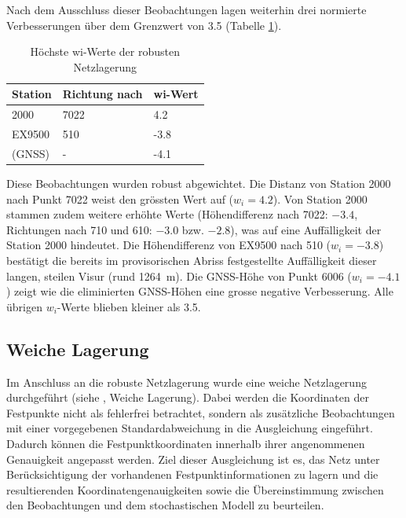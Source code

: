 Nach dem Ausschluss dieser Beobachtungen lagen weiterhin drei normierte
Verbesserungen über dem Grenzwert von 3.5 (Tabelle \ref{tab:wi-werte-robuste-netzlagerung}).

\begin{table}[H]
    \centering
    \begin{tabularx}{\textwidth}{p{2.2cm} X X}
        \toprule
        Station & Richtung nach & wi-Wert \\
        \midrule
        2000 & 7022 & 4.2  \\
        \addlinespace
        EX9500 & 510 & -3.8 \\
        \addlinespace
        6006 (GNSS) & - & -4.1 \\
        \bottomrule
    \end{tabularx}
    \caption{Höchste wi-Werte der robusten Netzlagerung}
    \label{tab:wi-werte-robuste-netzlagerung}
\end{table}

Diese Beobachtungen wurden robust abgewichtet. Die Distanz von Station 2000
nach Punkt 7022 weist den grössten Wert auf ($w_i = 4.2$). Von Station 2000 stammen
zudem weitere erhöhte Werte (Höhendifferenz nach 7022: $-3.4$, Richtungen
nach 710 und 610: $-3.0$ bzw. $-2.8$), was auf eine Auffälligkeit
der Station 2000 hindeutet. 
Die Höhendifferenz von EX9500 nach 510 ($w_i = -3.8$) bestätigt die bereits
im provisorischen Abriss festgestellte Auffälligkeit dieser langen, steilen
Visur (rund 1264~m). Die GNSS-Höhe von Punkt 6006 ($w_i = -4.1$)
zeigt wie die eliminierten GNSS-Höhen eine grosse negative Verbesserung.
Alle übrigen $w_i$-Werte blieben kleiner als 3.5.

\subsection{Weiche Lagerung}
\label{sec:weiche lagerung}
Im Anschluss an die robuste Netzlagerung wurde eine weiche Netzlagerung durchgeführt (siehe , Weiche Lagerung).
Dabei werden die Koordinaten der Festpunkte nicht als fehlerfrei betrachtet, sondern
als zusätzliche Beobachtungen mit einer vorgegebenen Standardabweichung in die Ausgleichung
eingeführt. Dadurch können die Festpunktkoordinaten innerhalb ihrer angenommenen Genauigkeit
angepasst werden. Ziel dieser Ausgleichung ist es, das Netz unter Berücksichtigung der
vorhandenen Festpunktinformationen zu lagern und die resultierenden Koordinatengenauigkeiten
sowie die Übereinstimmung zwischen den Beobachtungen und dem stochastischen Modell zu beurteilen. \bigskip

